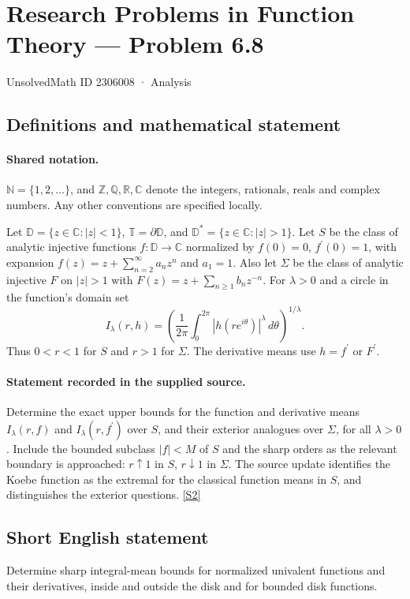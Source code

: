 \documentclass[11pt]{book}
\newcommand{\sref}[2]{\hyperlink{source:#1:#2}{[S#2]}}
\begin{document}
\setcounter{section}{2306007}
\section{Research Problems in Function Theory — Problem 6.8}\label{2306008}
{\small\sffamily UnsolvedMath ID 2306008 · Analysis}
\subsection{Definitions and mathematical statement}

\paragraph{Shared notation.}$\mathbb N=\{1,2,\ldots\}$, and $\mathbb Z,\mathbb Q,\mathbb R,\mathbb C$ denote the integers, rationals, reals and complex numbers. Any other conventions are specified locally.


Let $\mathbb D=\{z\in\mathbb C:|z|<1\}$, $\mathbb T=\partial\mathbb D$, and $\mathbb D^*=\{z\in\mathbb C:|z|>1\}$. Let $S$ be the class of analytic injective functions $f:\mathbb D\to\mathbb C$ normalized by $f(0)=0$, $f^{\prime}(0)=1$, with expansion $f(z)=z+\sum_{n=2}^{\infty}a_nz^n$ and $a_1=1$. Also let $\Sigma$ be the class of analytic injective $F$ on $|z|>1$ with $F(z)=z+\sum_{n\ge1}b_nz^{-n}$. For $\lambda>0$ and a circle in the function’s domain set \[I_\lambda(r,h)=\left(\frac1{2\pi}\int_0^{2\pi}|h(re^{i\theta})|^{\lambda}\,d\theta\right)^{1/\lambda}.\] Thus $0<r<1$ for $S$ and $r>1$ for $\Sigma$. The derivative means use $h=f^{\prime}$ or $F^{\prime}$.
\paragraph{Statement recorded in the supplied source.}
Determine the exact upper bounds for the function and derivative means $I_\lambda(r,f)$ and $I_\lambda(r,f^{\prime})$ over $S$, and their exterior analogues over $\Sigma$, for all $\lambda>0$. Include the bounded subclass $|f|<M$ of $S$ and the sharp orders as the relevant boundary is approached: $r\uparrow1$ in $S$, $r\downarrow1$ in $\Sigma$. The source update identifies the Koebe function as the extremal for the classical function means in $S$, and distinguishes the exterior questions. \sref{2306008}{2}
\subsection{Short English statement}
Determine sharp integral-mean bounds for normalized univalent functions and their derivatives, inside and outside the disk and for bounded disk functions.
\end{document}
